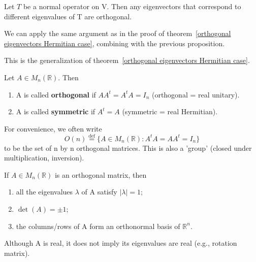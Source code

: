 \begin{theorem}
Let $T$ be a normal operator on V. Then any eigenvectors that correspond to different eigenvalues of T are orthogonal.
\end{theorem}

\begin{pfbox}
We can apply the same argument as in the proof of theorem~\eqref{orthogonal eigenvectors Hermitian case},
combining with the previous proposition.
\end{pfbox}

\begin{remark}
    This is the generalization of theorem~\eqref{orthogonal eigenvectors Hermitian case}.
\end{remark}


\begin{definition}
Let $A\in M_{n}(\mathbb{R})$. Then
\begin{enumerate}
    \item A is called \textbf{orthogonal} if $AA^{t}=A^{t}A=I_{n}$ (orthogonal = real unitary).
    \item A is called \textbf{symmetric} if $A^{t}=A$ (symmetric = real Hermitian).
\end{enumerate}
\end{definition}

\begin{remark}
For convenience, we often write
\[
O(n) \overset{\text{def}}{=} \{A \in M_{n}(\mathbb{R}) : A^{t}A = AA^{t} = I_{n}\}
\]
to be the set of n by n orthogonal matrices. This is also a 'group' (closed under multiplication, inversion).
\end{remark}

\begin{theorem}
If $A\in M_{n}(\mathbb{R})$ is an orthogonal matrix, then
\begin{enumerate}
    \item all the eigenvalues $\lambda$ of A satisfy $|\lambda|=1$;
    \item $\det(A) = \pm 1$;
    \item the columns/rows of A form an orthonormal basis of $\mathbb{R}^{n}$.
\end{enumerate}
\end{theorem}

\begin{remark}
Although A is real, it does not imply its eigenvalues are real (e.g., rotation matrix).
\end{remark}

